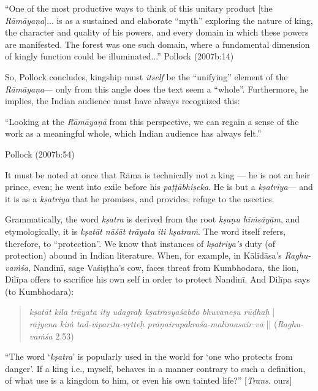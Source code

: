\begin{myquote}
“One of the most productive ways to think of this unitary product [the {\sl Rāmāyaṇa}]... is as a sustained and elaborate “myth” exploring the nature of king, the character and quality of his powers, and every domain in which these powers are manifested. The forest was one such domain, where a fundamental dimension of kingly function could be illuminated...” 
\hfill Pollock (2007b:14)
\end{myquote}

So, Pollock concludes, kingship must {\sl itself} be the “unifying” element of the {\sl Rāmāyaṇa}--- only from this angle does the text seem a “whole”. Furthermore, he implies, the Indian audience must have always recognized this: 

\begin{myquote}
“Looking at the {\sl Rāmāyaṇā} from this perspective, we can regain a sense of the work as a meaningful whole, which Indian audience has always felt.”

\hfill  Pollock (2007b:54)
\end{myquote}

It must be noted at once that Rāma is technically not a king --- he is not an heir prince, even; he went into exile before his {\sl paṭṭābhiṣeka}. He is but a {\sl kṣatriya}--- and it is as a {\sl kṣatriya} that he promises, and provides, refuge to the ascetics. 

Grammatically, the word {\sl kṣatra} is derived from the root {\sl kṣaṇu hiṁsāyām}, and etymologically, it is {\sl kṣatāt nāśāt trāyata iti kṣatraṁ}. The word itself refers, therefore, to “protection”.  We know that instances of {\sl kṣatriya’s} duty (of protection) abound in Indian literature. When, for example, in Kālidāsa’s {\sl Raghu-vaṁśa}, Nandinī, sage Vaśiṣṭha’s cow, faces threat from Kumbhodara, the lion, Dilīpa offers to sacrifice his own self in order to protect Nandinī. And Dilīpa says (to Kumbhodara):
\begin{quote}
{{\sl kṣatāt kila trāyata ity udagraḥ kṣatrasya\newline śabdo bhuvaneṣu rūḍhaḥ}} |\\
{\sl rājyena kiṁ tad-viparīta-vṛtteḥ prāṇair\newline upakrośa-malīmasair vā} ||   
\hfill ({\sl Raghu-vaṁśa} 2.53)
\end{quote}

\begin{myquote}
“The word ‘{\sl kṣatra}’ is popularly used in the world for ‘one who protects from danger’. If a king i.e., myself, behaves in a manner contrary to such a definition, of what use is a kingdom to him, or even his own tainted life?” 
\hfill[{\sl Trans.} ours]
\end{myquote}


